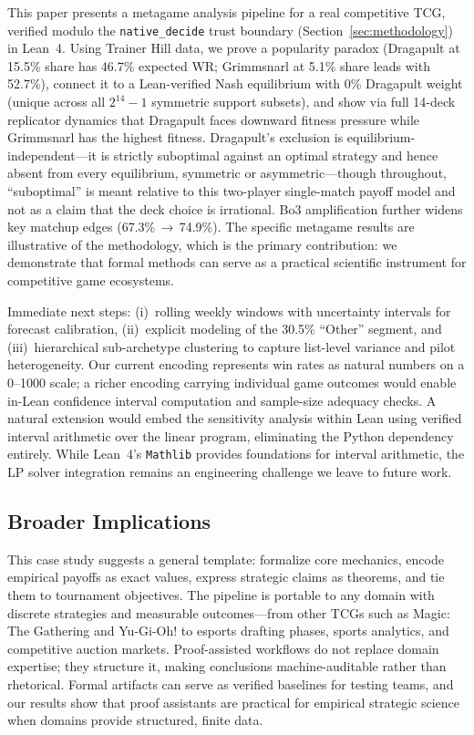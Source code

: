 \documentclass[journal]{IEEEtran}
\newif\ifhighlightchanges
\newcommand{\revised}[1]{\ifhighlightchanges\textcolor{blue!70!black}{#1}\else#1\fi}
\let\origsubsection\subsection
\renewcommand{\subsection}{\needspace{3\baselineskip}\origsubsection}
\begin{document}
This paper presents a metagame analysis pipeline for a real competitive TCG, verified modulo the \texttt{native\_decide} trust boundary (Section~\ref{sec:methodology}) in Lean~4.
Using Trainer Hill data, we prove a popularity paradox (Dragapult at 15.5\% share has 46.7\% expected WR; Grimmsnarl at 5.1\% share leads with 52.7\%), connect it to a Lean-verified Nash equilibrium with 0\% Dragapult weight (unique across all $2^{14}-1$ symmetric support subsets), and show via full 14-deck replicator dynamics that Dragapult faces downward fitness pressure while Grimmsnarl has the highest fitness.
\revised{Dragapult's exclusion is equilibrium-independent---it is strictly suboptimal against an optimal strategy and hence absent from every equilibrium, symmetric or asymmetric---though throughout, ``suboptimal'' is meant relative to this two-player single-match payoff model and not as a claim that the deck choice is irrational.}
Bo3 amplification further widens key matchup edges (67.3\%\,$\to$\,74.9\%).
The specific metagame results are illustrative of the methodology, which is the primary contribution: we demonstrate that formal methods can serve as a practical scientific instrument for competitive game ecosystems.

Immediate next steps: (i)~rolling weekly windows with uncertainty intervals for forecast calibration, (ii)~explicit modeling of the 30.5\% ``Other'' segment, and (iii)~hierarchical sub-archetype clustering to capture list-level variance and pilot heterogeneity.
Our current encoding represents win rates as natural numbers on a 0--1000 scale; a richer encoding carrying individual game outcomes would enable in-Lean confidence interval computation and sample-size adequacy checks.
A natural extension would embed the sensitivity analysis within Lean using verified interval arithmetic over the linear program, eliminating the Python dependency entirely.
While Lean~4's \texttt{Mathlib} provides foundations for interval arithmetic, the LP solver integration remains an engineering challenge we leave to future work.

\subsection{Broader Implications}

This case study suggests a general template: formalize core mechanics, encode empirical payoffs as exact values, express strategic claims as theorems, and tie them to tournament objectives.
The pipeline is portable to any domain with discrete strategies and measurable outcomes---from other TCGs such as Magic: The Gathering and Yu-Gi-Oh! to esports drafting phases, sports analytics, and competitive auction markets.
Proof-assisted workflows do not replace domain expertise; they structure it, making conclusions machine-auditable rather than rhetorical.
Formal artifacts can serve as verified baselines for testing teams, and our results show that proof assistants are practical for empirical strategic science when domains provide structured, finite data.
\end{document}
